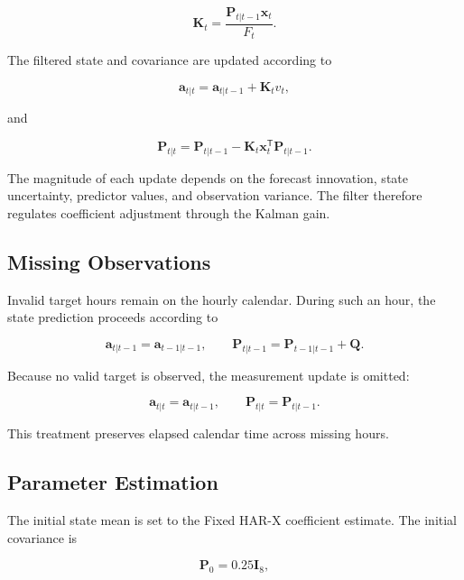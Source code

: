 \begin{equation}
\mathbf{K}_t
=
\frac{
\mathbf{P}_{t|t-1}
\mathbf{x}_t
}{
F_t
}.
\label{eq:kalman-gain}
\end{equation}

The filtered state and covariance are updated according to

\begin{equation}
\mathbf{a}_{t|t}
=
\mathbf{a}_{t|t-1}
+
\mathbf{K}_t v_t,
\label{eq:kalman-state-update}
\end{equation}

and

\begin{equation}
\mathbf{P}_{t|t}
=
\mathbf{P}_{t|t-1}
-
\mathbf{K}_t
\mathbf{x}_t^{\mathsf{T}}
\mathbf{P}_{t|t-1}.
\label{eq:kalman-covariance-update}
\end{equation}

The magnitude of each update depends on the forecast
innovation, state uncertainty, predictor values, and
observation variance. The filter therefore regulates
coefficient adjustment through the Kalman gain.

\subsection{Missing Observations}

Invalid target hours remain on the hourly calendar. During
such an hour, the state prediction proceeds according to

\[
\mathbf{a}_{t|t-1}
=
\mathbf{a}_{t-1|t-1},
\qquad
\mathbf{P}_{t|t-1}
=
\mathbf{P}_{t-1|t-1}
+
\mathbf{Q}.
\]

Because no valid target is observed, the measurement update is
omitted:

\[
\mathbf{a}_{t|t}
=
\mathbf{a}_{t|t-1},
\qquad
\mathbf{P}_{t|t}
=
\mathbf{P}_{t|t-1}.
\]

This treatment preserves elapsed calendar time across missing
hours.

\subsection{Parameter Estimation}

The initial state mean is set to the Fixed HAR-X coefficient
estimate. The initial covariance is

\begin{equation}
\mathbf{P}_0
=
0.25\mathbf{I}_8,
\label{eq:initial-state-covariance}
\end{equation}


